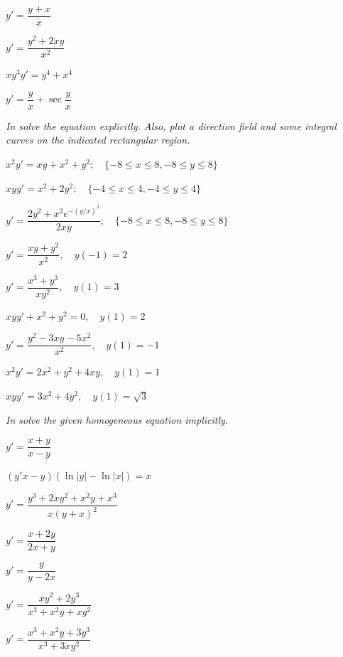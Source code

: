\begin{exerciselistTwoColumn}
\item\label{exer:2.4.15}$y'=\dfrac{y+x}{x}$
\item\label{exer:2.4.16}$y'=\dfrac{y^2+2xy }{x^2}$
\item\label{exer:2.4.17}$xy^3y'=y^4+x^4$
\item\label{exer:2.4.18}$y'=\dfrac{y}{x}+\sec\dfrac{y}{x}$
\end{exerciselistTwoColumn}

\textsl{In  solve the
equation explicitly.
 Also, plot a direction field and some integral curves on
the indicated rectangular region.}

\begin{exerciselist}
  \item\label{exer:2.4.19}\CGex
$x^2y'=xy+x^2+y^2;   \quad \{-8\le x\le 8,-8\le y\le 8\}$

 \item\label{exer:2.4.20}\CGex
$xyy'=x^2+2y^2;  \quad \{-4\le x\le 4,-4\le y\le 4\}$


\item\label{exer:2.4.21}\CGex
$y'=\dfrac{2y^2+x^2e^{-(y/x)^2}}{2xy};\quad  \{-8\le x\le 8,-8\le y\le 8\}$



\item\label{exer:2.4.22}$y'=\dfrac{xy+y^2}{x^2},\quad y(-1)=2$

 \item\label{exer:2.4.23}$y'=\dfrac{x^3+y^3}{xy^2}, \quad y(1)=3$

 \item\label{exer:2.4.24}$xyy'+x^2+y^2=0, \quad y(1)=2$

\item\label{exer:2.4.25}$y'=\dfrac{y^2-3xy-5x^2 }{x^2}, \quad y(1)=-1$

\item\label{exer:2.4.26}$x^2y'=2x^2+y^2+4xy, \quad y(1)=1$

\item\label{exer:2.4.27}$xyy'=3x^2+4y^2, \quad y(1)=\sqrt{3}$
\end{exerciselist}
%
\textsl{In  solve the
given homogeneous equation implicitly.}

\begin{exerciselistTwoColumn}
\item\label{exer:2.4.28}$y'=\dfrac{x+y }{x-y}$
\item\label{exer:2.4.29}$(y'x-y)(\ln |y|-\ln |x|)=x$
\item\label{exer:2.4.30}$y'=\dfrac{y^3+2xy^2+x^2y+x^3}{x(y+x)^2}$ 
\item\label{exer:2.4.31}$y'=\dfrac{x+2y }{2x+y}$
\item\label{exer:2.4.32}$y'=\dfrac{y }{y-2x}$
\item\label{exer:2.4.33}$y'=\dfrac{xy^2+2y^3}{x^3+x^2y+xy^2}$
\item\label{exer:2.4.34}$y'=\dfrac{x^3+x^2y+3y^3 }{x^3+3xy^2}$
\end{exerciselistTwoColumn}

